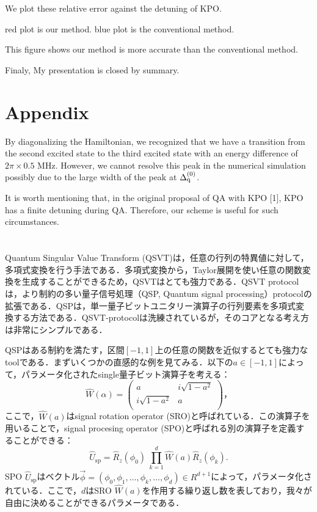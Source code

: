 {{We plot these relative error against the detuning of KPO.

red plot is our method. blue plot is the conventional method.

This figure shows our method is more accurate than the conventional method.




Finaly, My presentation is closed by summary.

\section{Appendix}
By diagonalizing the Hamiltonian, we recognized that
we have a transition from the second excited state to the
third excited state with an energy difference of $2π × 0.5$
MHz. However, we cannot resolve this peak in the numerical simulation possibly due to the large width of the
peak at $\Delta_{\rm{q}}^{(0)}$.


It
is worth mentioning that, in the original proposal of QA
with KPO [1], KPO has a finite detuning during QA.
Therefore, our scheme is useful for such circumstances.
}}

\section{}
Quantum Singular Value Transform (QSVT)は，任意の行列の特異値に対して，多項式変換を行う手法である．多項式変換から，Taylor展開を使い任意の関数変換を生成することができるため，QSVTはとても強力である．QSVT protocolは，より制約の多い量子信号処理（QSP, Quantum signal processing）protocolの拡張である．QSPは，単一量子ビットユニタリー演算子の行列要素を多項式変換する方法である．QSVT-protocolは洗練されているが，そのコアとなる考え方は非常にシンプルである．


QSPはある制約を満たす，区間$[-1, 1]$上の任意の関数を近似するとても強力なtoolである．まずいくつかの直感的な例を見てみる．以下の$a\in[-1,1]$によって，パラメータ化されたsingle量子ビット演算子を考える：
\begin{equation}
    \hat{W}(\alpha)=\left(
        \begin{array}{cc}
       a&i\sqrt{1-a^2}\\[10pt]
        i\sqrt{1-a^2}&a \\
        \end{array}
        \right)，
\end{equation}
ここで，$\hat{W}(a)$はsignal rotation operator (SRO)と呼ばれている．この演算子を用いることで，signal procesing operator (SPO)と呼ばれる別の演算子を定義することができる：
\begin{equation}
    \hat{U}_{\mathrm{sp}} = \hat{R}_z(\phi_0)\ \prod_{k=1}^{d}\hat{W}(a)\hat{R}_z(\phi_k).
\end{equation}
SPO $\hat{U}_{\mathrm{sp}}$はベクトル$\vec{\phi}=(\phi_0,\phi_1,\ldots,\phi_k,\ldots,\phi_d)\in\mathbb{}{R}^{d+1}$によって，パラメータ化されている．ここで，$d$はSRO $\hat{W}(a)$を作用する繰り返し数を表しており，我々が自由に決めることができるパラメータである．


